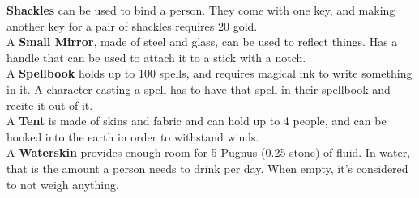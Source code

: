 \textbf{Shackles} can be used to bind a person. They come with one key, and making another key for a pair of shackles requires 20 gold.\\

A \textbf{Small Mirror}, made of steel and glass, can be used to reflect things. Has a handle that can be used to attach it to a stick with a notch.\\

A \textbf{Spellbook} holds up to 100 spells, and requires magical ink to write something in it. A character casting a spell has to have that spell in their spellbook and recite it out of it.\\

A \textbf{Tent} is made of skins and fabric and can hold up to 4 people, and can be hooked into the earth in order to withstand winds.\\

A \textbf{Waterskin} provides enough room for 5 Pugnus (0.25 stone) of fluid. In water, that is the amount a person needs to drink per day. When empty, it's considered to not weigh anything.\\